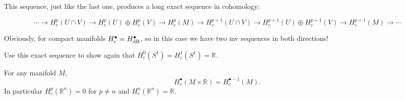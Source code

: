 \documentclass[english,letterpaper]{article}%
\numberwithin{equation}{section}
\numberwithin{figure}{section}
\numberwithin{table}{section}
\theoremstyle{definition}
\theoremstyle{definition}
\theoremstyle{definition}
\theoremstyle{plain}
\theoremstyle{plain}
\theoremstyle{plain}
\theoremstyle{plain}
\theoremstyle{remark}
\theoremstyle{remark}
\newcommand{\bbR}{\mathbb{R}}
\begin{document}
This sequence, just like the last one, produces a long exact sequence in cohomology:

\[\cdots\to H_c^p(U\cap V)\to H_c^p(U)\oplus H_c^p(V)\to H_c^p(M)\to H_c^{p+1}(U\cap V)\to H_c^{p+1}(U)\oplus H_c^{p+1}(V)\to H_c^{p+1}(M)\to \cdots\]

Obviously, for compact manifolds $H^\bullet_c=H^\bullet_{\rm dR}$, so in this case we have two \gls{mv} sequences in both directions!

\begin{xca}
    Use this exact sequence to show again that $H_c^0(S^1)=H_c^1(S^1)=\bbR$.
\end{xca}

\begin{thm}
    For any manifold $M$, 
    \[H_c^\bullet(M\times \bbR)=H_c^{\bullet-1}(M).\] 
    In particular $H_c^p(\bbR^n)=0$ for $p\neq n$ and $H_c^n(\bbR^n)=\bbR$.
\end{thm}
\end{document}
